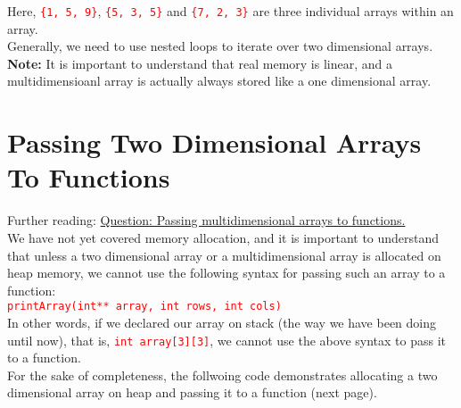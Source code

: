 \documentclass[12pt]{article}
\begin{document}
\vspace{1cm}

\noindent Here, \textcolor{red}{\texttt{\{1, 5, 9\}}}, \textcolor{red}{\texttt{\{5, 3, 5\}}} and \textcolor{red}{\texttt{\{7, 2, 3\}}} are three individual arrays within an array. \\

\noindent Generally, we need to use nested loops to iterate over two dimensional arrays. \\

\noindent \textbf{Note:} It is important to understand that real memory is linear, and a multidimensioanl array is actually always stored like a one dimensional array. \\



\newpage
{}
\section*{Passing Two Dimensional Arrays To Functions}

\noindent Further reading: \href{https://www.reddit.com/r/C_Programming/comments/t61f7o/question_passing_multidimensional_arrays_to/}{Question: Passing multidimensional arrays to functions.} \\

\noindent We have not yet covered memory allocation, and it is important to understand that unless a two dimensional array or a multidimensional array is allocated on heap memory, we cannot 
use the following syntax for passing such an array to a function: \\

\noindent \textcolor{red}{\texttt{printArray(int** array, int rows, int cols)}} \\

\noindent In other words, if we declared our array on stack (the way we have been doing until now), that is, \textcolor{red}{\texttt{int array[3][3]}}, we cannot use the above syntax to pass it to a function. \\

\noindent For the sake of completeness, the follwoing code demonstrates allocating a two dimensional array on heap and passing it to a function (next page).\\  

\newpage
\end{document}
